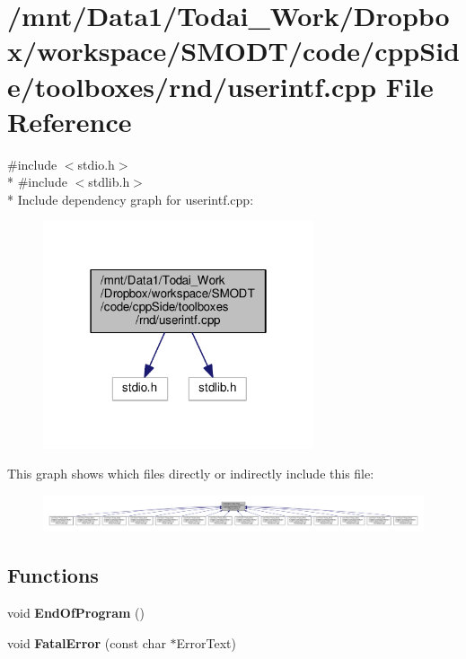 \section{/mnt/\-Data1/\-Todai\-\_\-\-Work/\-Dropbox/workspace/\-S\-M\-O\-D\-T/code/cpp\-Side/toolboxes/rnd/userintf.cpp File Reference}
\label{toolboxes_2rnd_2userintf_8cpp}
{\ttfamily \#include $<$stdio.\-h$>$}\\*
{\ttfamily \#include $<$stdlib.\-h$>$}\\*
Include dependency graph for userintf.\-cpp\-:\nopagebreak
\begin{figure}[H]
\begin{center}
\leavevmode
\includegraphics[width=226pt]{toolboxes_2rnd_2userintf_8cpp__incl}
\end{center}
\end{figure}
This graph shows which files directly or indirectly include this file\-:\nopagebreak
\begin{figure}[H]
\begin{center}
\leavevmode
\includegraphics[width=350pt]{toolboxes_2rnd_2userintf_8cpp__dep__incl}
\end{center}
\end{figure}
\subsection*{Functions}
\begin{DoxyCompactItemize}
\item 
void {\bf End\-Of\-Program} ()
\item 
void {\bf Fatal\-Error} (const char $\ast$Error\-Text)
\end{DoxyCompactItemize}



